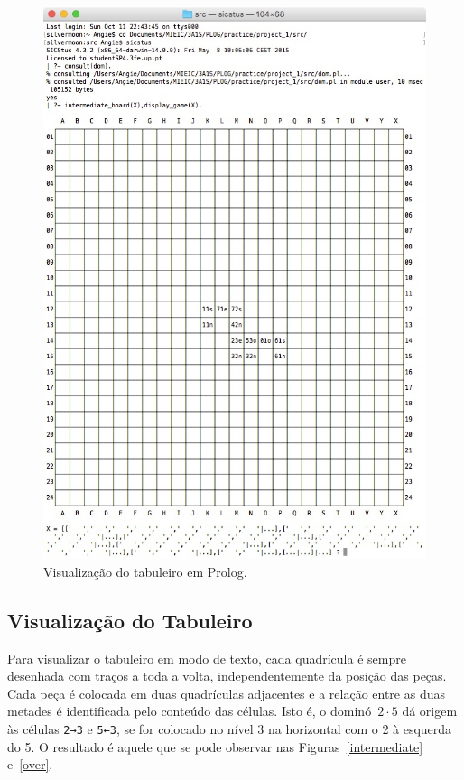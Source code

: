 \documentclass[a4paper]{article}
\begin{document}
\begin{figure}[htbp]
\begin{center}
\includegraphics[scale=0.6]{inter_output.jpg}
\caption{Visualização do tabuleiro em Prolog.}
\label{inter_output}
\end{center}
\end{figure}

\subsection{Visualização do Tabuleiro}
 
Para visualizar o tabuleiro em modo de texto, cada quadrícula é sempre desenhada com traços a toda a volta, independentemente da posição das peças. Cada peça é colocada em duas quadrículas adjacentes e a relação entre as duas metades é identificada pelo conteúdo das células. Isto é, o dominó~$2 \cdot 5$ dá origem às células \verb|2→3| e \verb|5←3|, se for colocado no nível 3 na horizontal com o 2 à esquerda do 5. O resultado é aquele que se pode observar nas Figuras~\ref{intermediate} e~\ref{over}.
\end{document}
